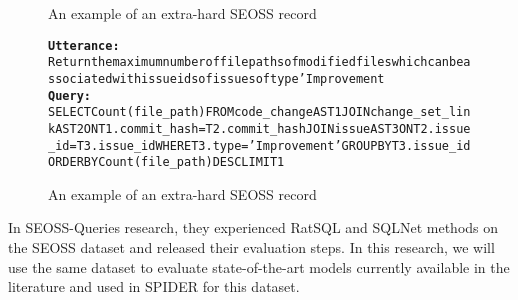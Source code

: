 \begin{figure}[H]
    \label{fig:SESS2}
    \begin{AIbox}{An example of an extra-hard SEOSS record}
        \vspace{-5px}
        \parbox{1\textwidth}{\scriptsize
        \begin{alltt} \larger
            {\bf Utterance:} \\ 
            Return  the maximum number of file paths of modified files which can be associated with issue ids of issues of type 'Improvement
            \\
            {\bf Query:} \\
            SELECT Count(file\_path) FROM code\_change AS T1 JOIN change\_set\_link AS T2 ON T1.commit\_hash = T2.commit\_hash JOIN issue AS T3 ON T2.issue\_id = T3.issue\_id WHERE T3.type = 'Improvement' GROUP BY T3.issue\_id ORDER BY Count(file\_path) DESC LIMIT 1
        \end{alltt}
        }
        \vspace{-5px}
    \end{AIbox}
    
    \caption{An example of an extra-hard SEOSS record}
\end{figure}

In SEOSS-Queries\cite{TOMOVA2022108211} research, they experienced RatSQL and SQLNet methods on the SEOSS dataset and released their evaluation steps. In this research, we will use the same dataset to evaluate state-of-the-art models currently available in the literature and used in SPIDER for this dataset.
